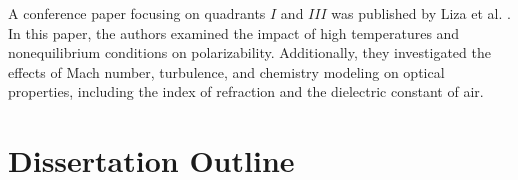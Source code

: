     A conference paper focusing on quadrants $I$ and $III$ was published by Liza et al.  \cite{Liza2023}. In this paper, the authors examined the impact of high temperatures and nonequilibrium conditions on polarizability. Additionally, they investigated the effects of Mach number, turbulence, and chemistry modeling on optical properties, including the index of refraction and the dielectric constant of air.

    \section{Dissertation Outline\label{chS:dissertationOutline}}
